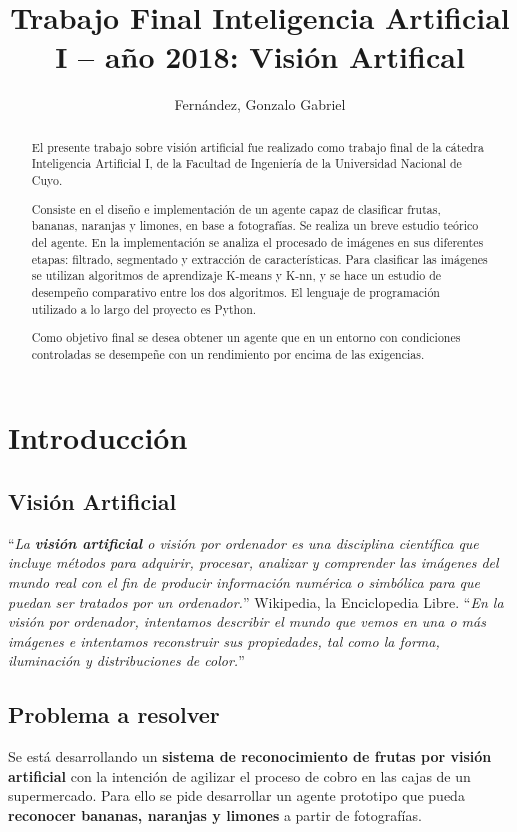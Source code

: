 \documentclass[10pt,a4paper]{article}
\author{Fernández, Gonzalo Gabriel}
\title{Trabajo Final Inteligencia Artificial I – año 2018: Visión Artifical}
\begin{document}
\maketitle

\begin{abstract}
El presente trabajo sobre visión artificial fue realizado como trabajo final de la cátedra Inteligencia Artificial I, de la Facultad de Ingeniería de la Universidad Nacional de Cuyo.

Consiste en el diseño e implementación de un agente capaz de clasificar frutas, bananas, naranjas y limones, en base a fotografías. Se realiza un breve estudio teórico del agente. En la implementación se analiza el procesado de imágenes en sus diferentes etapas: filtrado, segmentado y extracción de características. Para clasificar las imágenes se utilizan algoritmos de aprendizaje K-means y K-nn, y se hace un estudio de desempeño comparativo entre los dos algoritmos. El lenguaje de programación utilizado a lo largo del proyecto es Python.

Como objetivo final se desea obtener un agente que en un entorno con condiciones controladas se desempeñe con un rendimiento por encima de las exigencias.
\end{abstract}

\section{Introducción}

\subsection{Visión Artificial\label{vision}}
``\textit{La \textbf{visión artificial} o visión por ordenador es una disciplina científica que incluye métodos para adquirir, procesar, analizar y comprender las imágenes del mundo real con el fin de producir información numérica o simbólica para que puedan ser tratados por un ordenador.}'' Wikipedia, la Enciclopedia Libre.
``\textit{En la visión por ordenador, intentamos describir el mundo que vemos en una o más imágenes e intentamos reconstruir sus propiedades, tal como la forma, iluminación y distribuciones de color.}'' \textcite{szeliski}

\subsection{Problema a resolver}
Se está desarrollando un \textbf{sistema de reconocimiento de frutas por visión artificial} con la intención de agilizar el proceso de cobro en las cajas de un supermercado. Para ello se
pide desarrollar un agente prototipo que pueda \textbf{reconocer bananas, naranjas y limones} a partir de fotografías.
\end{document}

